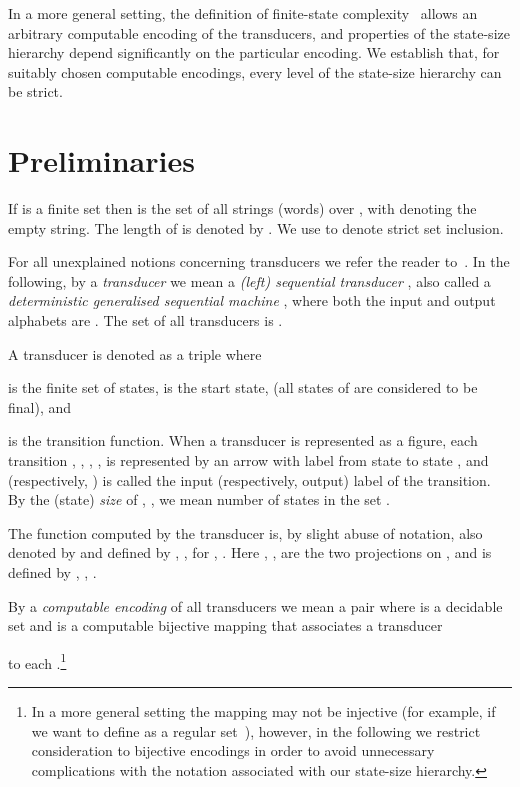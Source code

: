 \documentclass[copyright]{eptcs}
\begin{document}
In a more general setting,
the definition of finite-state complexity~\cite{CSR} allows
an arbitrary computable encoding of the transducers,
and properties of the state-size hierarchy
depend significantly on the particular encoding.
We establish that,  for
suitably chosen computable encodings,
every level of the state-size hierarchy can be strict.

\section{Preliminaries}
\label{prelim}

If  is a finite set then  is the set of all strings
(words) over , with  denoting the empty string.
The length of  
is denoted by .  We use  to denote strict
set inclusion.

For all unexplained notions concerning transducers we
refer the reader to~\cite{Be,Yu}.
In the following, by a {\em transducer\/}
we mean a {\em (left) sequential
transducer\/} \cite{Be}, also called a {\em deterministic generalised
sequential machine\/}  \cite{Yu},
where both the input and output alphabets are .
The set of all transducers is .

A transducer  is denoted as
a triple  where

 is the finite set of states,  is the start state,
(all states of  are considered to be final),
and

is the transition function. 
When a transducer is represented
as a figure, each transition ,
, , , is
represented by an arrow with label  from state  to
state , and  (respectively, ) is called the input (respectively,
output) label of the transition. By the (state) {\em size\/} of ,
, we mean number   of states in the set .


The function  computed by
the transducer   is, by slight abuse of
notation, also denoted by  and
defined by
,
,
for
,
. Here , , are the
two projections on ,
and  is defined by  , , 
.

By a  {\em computable encoding\/} of all transducers 
we mean a pair
 where   is
a decidable set and 
is a computable bijective mapping  that associates
a transducer

to each .\footnote{In
a more general setting the mapping  may not be injective
(for example, if we want to define  as a regular set~\cite{CSR}),
however, in the following we restrict consideration to bijective
encodings in order to avoid unnecessary complications with
the notation associated with our state-size hierarchy.}
\end{document}
